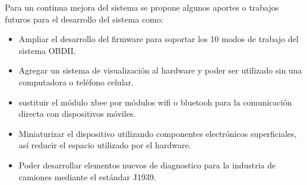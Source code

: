 Para un continua mejora del sistema se propone algunos aportes o trabajos futuros para el desarrollo del sistema como: 
\begin{itemize}
    \item Ampliar el desarrollo del firmware para soportar los 10 modos de trabajo del sistema OBDII. 
    \item Agregar un sistema de visualización al hardware y poder ser utilizado sin una computadora o teléfono celular. 
    \item sustituir el módulo xbee por módulos wifi o bluetooh para la comunicación directa con dispositivos móviles. 
    \item Miniaturizar el dispositivo utilizando componentes electrónicos superficiales, así reducir el espacio utilizado por el hardware. 
    \item Poder desarrollar elementos nuevos de diagnostico para la industria de camiones mediante el estándar J1939. 
\end{itemize}






	

	

	

